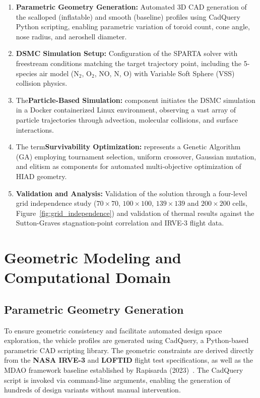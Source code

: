 \begin{enumerate}
    \item \textbf{Parametric Geometry Generation:} Automated 3D CAD generation of the scalloped (inflatable) and smooth (baseline) profiles using CadQuery Python scripting, enabling parametric variation of toroid count, cone angle, nose radius, and aeroshell diameter.

    \item \textbf{DSMC Simulation Setup:} Configuration of the SPARTA solver with freestream conditions matching the target trajectory point, including the 5-species air model (N$_2$, O$_2$, NO, N, O) with Variable Soft Sphere (VSS) collision physics.

    \item The\textbf{Particle-Based Simulation:} component initiates the DSMC simulation in a Docker containerized Linux environment, observing a vast array of particle trajectories through advection, molecular collisions, and surface interactions.
    \item The term\textbf{Survivability Optimization:} represents a Genetic Algorithm (GA) employing tournament selection, uniform crossover, Gaussian mutation, and elitism as components for automated multi-objective optimization of HIAD geometry.

    \item \textbf{Validation and Analysis:} Validation of the solution through a four-level grid independence study ($70\times70$, $100\times100$, $139\times139$ and $200\times200$ cells, Figure~\ref{fig:grid_independence}) and validation of thermal results against the Sutton-Graves stagnation-point correlation and IRVE-3 flight data.
\end{enumerate}

\section{Geometric Modeling and Computational Domain}

\subsection{Parametric Geometry Generation}
To ensure geometric consistency and facilitate automated design space exploration, the vehicle profiles are generated using CadQuery, a Python-based parametric CAD scripting library. The geometric constraints are derived directly from the \textbf{NASA IRVE-3} and \textbf{LOFTID} flight test specifications, as well as the MDAO framework baseline established by Rapisarda (2023)~\cite{rapisarda2023mdao}. The CadQuery script is invoked via command-line arguments, enabling the generation of hundreds of design variants without manual intervention.

